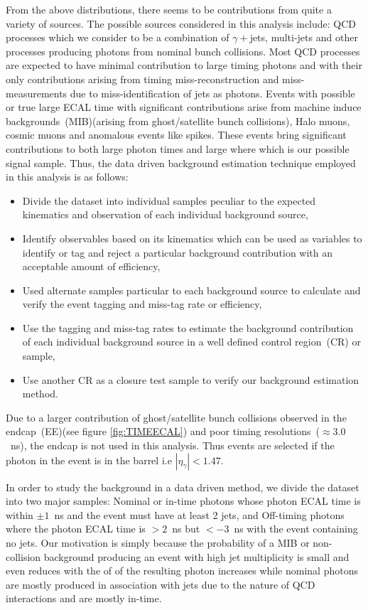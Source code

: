 From the above distributions, there seems to be contributions from quite a variety of sources. The possible sources considered in this analysis include: QCD processes  which we consider to be a combination of $\gamma + $jets, multi-jets and other processes producing photons from nominal bunch collisions. Most QCD processes are expected to have minimal contribution to large timing photons and \MET with their only contributions arising from timing miss-reconstruction and \MET miss-measurements due to miss-identification of jets as photons. Events with possible or true large ECAL time with significant contributions arise from machine induce backgrounds~(MIB)(arising from ghost/satellite bunch collisions), Halo muons, cosmic muons and anomalous events like spikes. These events bring significant contributions to both large photon times and large \MET where which is our possible signal sample.
Thus, the data driven background estimation technique employed in this analysis is as follows:

\begin{itemize}
\item Divide the dataset into individual samples peculiar to the expected kinematics and observation of each individual background source,
\item Identify observables based on its kinematics which can be used as variables to identify or tag and reject a particular background contribution with an acceptable amount of efficiency,
\item Used alternate samples particular to each background source to calculate and verify the event tagging and miss-tag rate or efficiency,
\item Use the tagging and miss-tag rates to estimate the background contribution of each individual background source in a well defined control region~(CR) or sample,
\item Use another CR as a closure test sample to verify our background estimation method.
\end{itemize}

Due to a larger contribution of ghost/satellite bunch collisions observed in the endcap~(EE)(see figure \ref{fig:TIMEECAL}) and poor timing resolutions~($\approx 3.0$~ns), the endcap is not used in this analysis. Thus events are selected if the photon in the event is in the barrel i.e $|\eta_{\gamma}| < 1.47$.

In order to study the background in a data driven method, we divide the dataset into two major samples: Nominal or in-time photons whose photon ECAL time is within $\pm 1$~ns and the event must have at least 2 jets,  and Off-timing photons where the photon ECAL time is $ > 2$~ns but $ < -3$~ns with the event containing no jets. Our motivation is simply because the probability of a MIB or non-collision background producing an event with high jet multiplicity is small  and even reduces with the \pt of of the resulting photon increases while nominal photons are mostly produced in association with jets due to the nature of QCD interactions and are mostly in-time.

